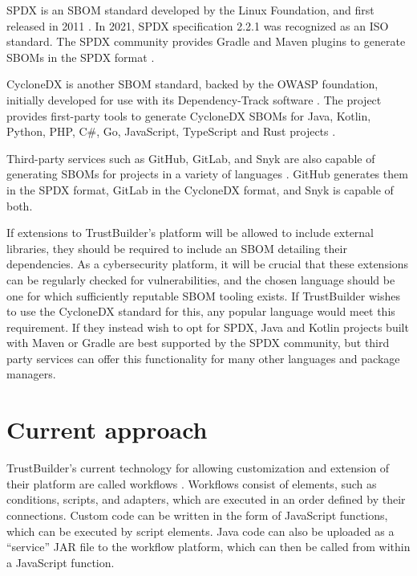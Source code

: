 SPDX is an SBOM standard developed by the Linux Foundation, and first released in 2011 \autocite{SPDXAbout}. In 2021, SPDX specification 2.2.1 was recognized as an ISO standard.
The SPDX community provides Gradle and Maven plugins to generate SBOMs in the SPDX format \autocite{SPDXTools}.

CycloneDX is another SBOM standard, backed by the OWASP foundation, initially developed for use with its Dependency-Track software \autocite{CycloneDXHistory}. The project provides first-party tools to generate CycloneDX SBOMs for Java, Kotlin, Python, PHP, C\#, Go, JavaScript, TypeScript and Rust projects \autocite{CDXTools2024}.

Third-party services such as GitHub, GitLab, and Snyk are also capable of generating SBOMs for projects in a variety of languages \autocite{GitHubSBOM,Gittlen2024,Snyk2024}. GitHub generates them in the SPDX format, GitLab in the CycloneDX format, and Snyk is capable of both.


If extensions to TrustBuilder's platform will be allowed to include external libraries, they should be required to include an SBOM detailing their dependencies. As a cybersecurity platform, it will be crucial that these extensions can be regularly checked for vulnerabilities, and the chosen language should be one for which sufficiently reputable SBOM tooling exists. If TrustBuilder wishes to use the CycloneDX standard for this, any popular language would meet this requirement. If they instead wish to opt for SPDX, Java and Kotlin projects built with Maven or Gradle are best supported by the SPDX community, but third party services can offer this functionality for many other languages and package managers.

\section{Current approach}
TrustBuilder's current technology for allowing customization and extension of their platform are called workflows \autocite{DefiningWorkflows}. Workflows consist of elements, such as conditions, scripts, and adapters, which are executed in an order defined by their connections. Custom code can be written in the form of JavaScript functions, which can be executed by script elements. Java code can also be uploaded as a ``service'' JAR file to the workflow platform, which can then be called from within a JavaScript function.

